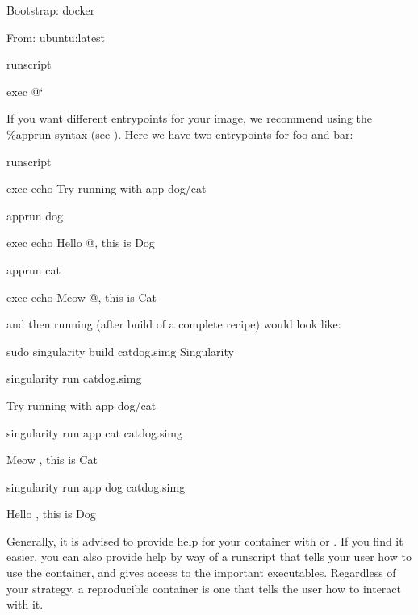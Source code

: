 \documentclass[letterpaper,10pt,english]{sphinxmanual}
\begin{document}
%
\begin{sphinxVerbatim}[commandchars=\\\{\}]
Bootstrap: docker

From: ubuntu:latest


\PYGZpc{}runscript

exec \PYGZdq{}\PYGZdl{}@\PYGZdq{}{}`
\end{sphinxVerbatim}

If you want different entrypoints for your image, we recommend using the \%apprun syntax (see {\hyperref[\detokenize{reproducible_scif_apps:reproducible-scif-apps}]{}}). Here we have two entrypoints for foo and bar:

%
\begin{sphinxVerbatim}[commandchars=\\\{\}]
\PYGZpc{}runscript

exec echo \PYGZdq{}Try running with \PYGZhy{}\PYGZhy{}app dog/cat\PYGZdq{}


\PYGZpc{}apprun dog

exec echo Hello \PYGZdq{}\PYGZdl{}@\PYGZdq{}, this is Dog


\PYGZpc{}apprun cat

exec echo Meow \PYGZdq{}\PYGZdl{}@\PYGZdq{}, this is Cat
\end{sphinxVerbatim}

and then running (after build of a complete recipe) would look like:

%
\begin{sphinxVerbatim}[commandchars=\\\{\}]
sudo singularity build catdog.simg Singularity


\PYGZdl{} singularity run catdog.simg

Try running with \PYGZhy{}\PYGZhy{}app dog/cat


\PYGZdl{} singularity run \PYGZhy{}\PYGZhy{}app cat catdog.simg

Meow , this is Cat

\PYGZdl{} singularity run \PYGZhy{}\PYGZhy{}app dog catdog.simg

Hello , this is Dog
\end{sphinxVerbatim}

Generally, it is advised to provide help for your container with  or . If
you find it easier, you can also provide help by way of a runscript that
tells your user how to use the container, and gives access to the
important executables. Regardless of your strategy. a reproducible
container is one that tells the user how to interact with it.
\end{document}
